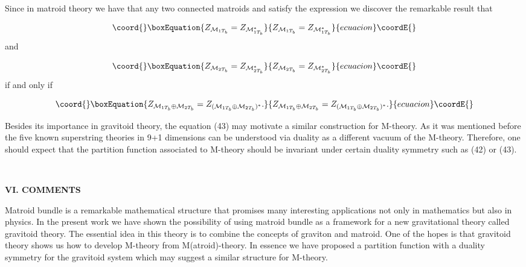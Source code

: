 \documentclass[a4paper,12pt]{article}
\begin{document}
Since in matroid theory we have that any two connected matroids \coordHE{} and \coordHE{} satisfy the expression \coordHE{} we discover the remarkable result that

\begin{equation}\coord{}\boxEquation{
Z_{\mathcal{M}_{1T_{b}}}=Z_{\mathcal{M}_{1T_{b}}^{\ast }}  \label{47}
}{
Z_{\mathcal{M}_{1T_{b}}}=Z_{\mathcal{M}_{1T_{b}}^{\ast }}  }{ecuacion}\coordE{}\end{equation}
and

\begin{equation}\coord{}\boxEquation{
Z_{\mathcal{M}_{2T_{b}}}=Z_{\mathcal{M}_{2T_{b}}^{\ast }}  \label{48}
}{
Z_{\mathcal{M}_{2T_{b}}}=Z_{\mathcal{M}_{2T_{b}}^{\ast }}  }{ecuacion}\coordE{}\end{equation}
if and only if

\begin{equation}\coord{}\boxEquation{
Z_{\mathcal{M}_{1T_{b}}\oplus \mathcal{M}_{2T_{b}}}=Z_{(\mathcal{M}
_{1T_{b}}\oplus \mathcal{M}_{2T_{b}})^{\ast }}.  \label{49}
}{
Z_{\mathcal{M}_{1T_{b}}\oplus \mathcal{M}_{2T_{b}}}=Z_{(\mathcal{M}
_{1T_{b}}\oplus \mathcal{M}_{2T_{b}})^{\ast }}.  }{ecuacion}\coordE{}\end{equation}

Besides its importance in gravitoid theory, the equation (43) may motivate a
similar construction for M-theory. As it was mentioned before the five known
superstring theories in 9+1 dimensions can be understood via duality as a
different vacuum of the M-theory. Therefore, one should expect that the
partition function associated to M-theory should be invariant under certain
duality symmetry such as (42) or (43).

\bigskip

\smallskip\ 

\noindent \textbf{VI. COMMENTS}

\bigskip

Matroid bundle is a remarkable mathematical structure that promises many
interesting applications not only in mathematics but also in physics. In the
present work we have shown the possibility of using matroid bundle as a
framework for a new gravitational theory called gravitoid theory. The
essential idea in this theory is to combine the concepts of graviton and
matroid. One of the hopes is that gravitoid theory shows us how to develop
M-theory from M(atroid)-theory. In essence we have proposed a partition
function with a duality symmetry for the gravitoid system which may suggest
a similar structure for M-theory.
\end{document}
